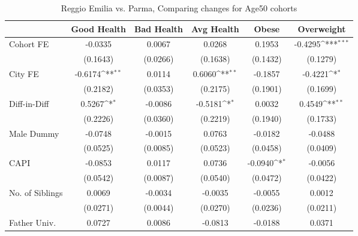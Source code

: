\begin{table}[htbp]\centering
\def\sym#1{\ifmmode^{#1}\else\(^{#1}\)\fi}
\caption{Reggio Emilia vs. Parma, Comparing changes for Age50 cohorts}
\begin{tabular}{l*{5}{c}}
\toprule
            &\multicolumn{1}{c}{Good Health}&\multicolumn{1}{c}{Bad Health}&\multicolumn{1}{c}{Avg Health}&\multicolumn{1}{c}{Obese}&\multicolumn{1}{c}{Overweight}\\
\midrule
Cohort FE   &     -0.0335         &      0.0067         &      0.0268         &      0.1953         &     -0.4295\sym{***}\\
            &    (0.1643)         &    (0.0266)         &    (0.1638)         &    (0.1432)         &    (0.1279)         \\
\addlinespace
City FE     &     -0.6174\sym{**} &      0.0114         &      0.6060\sym{**} &     -0.1857         &     -0.4221\sym{*}  \\
            &    (0.2182)         &    (0.0353)         &    (0.2175)         &    (0.1901)         &    (0.1699)         \\
\addlinespace
Diff-in-Diff&      0.5267\sym{*}  &     -0.0086         &     -0.5181\sym{*}  &      0.0032         &      0.4549\sym{**} \\
            &    (0.2226)         &    (0.0360)         &    (0.2219)         &    (0.1940)         &    (0.1733)         \\
\addlinespace
Male Dummy  &     -0.0748         &     -0.0015         &      0.0763         &     -0.0182         &     -0.0488         \\
            &    (0.0525)         &    (0.0085)         &    (0.0523)         &    (0.0458)         &    (0.0409)         \\
\addlinespace
CAPI        &     -0.0853         &      0.0117         &      0.0736         &     -0.0940\sym{*}  &     -0.0056         \\
            &    (0.0542)         &    (0.0087)         &    (0.0540)         &    (0.0472)         &    (0.0422)         \\
\addlinespace
No. of Siblings&      0.0069         &     -0.0034         &     -0.0035         &     -0.0055         &      0.0012         \\
            &    (0.0271)         &    (0.0044)         &    (0.0270)         &    (0.0236)         &    (0.0211)         \\
\addlinespace
Father Univ.&      0.0727         &      0.0086         &     -0.0813         &     -0.0188         &      0.0371         \\

\end{tabular}
\end{table}
